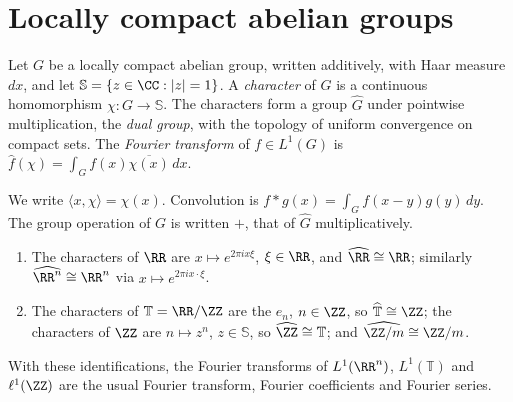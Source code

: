 \section{Locally compact abelian groups}\label{harmonic-analysis:section-lca}

\begin{definition}\label{harmonic-analysis:definition-dual-group}
Let $G$ be a locally compact abelian group, written additively, with Haar measure $dx$, and let $\mathbb{S} = \{z \in \CC : |z| = 1\}$. A \emph{character} of $G$ is a continuous homomorphism $\chi \colon G \to \mathbb{S}$.
The characters form a group $\widehat G$ under pointwise multiplication, the \emph{dual group}, with the topology of uniform convergence on compact sets. The \emph{Fourier transform} of $f \in L^1(G)$ is
$\hat f(\chi) = \int_Gf(x)\overline{\chi(x)}\,dx$.
\end{definition}

\begin{notation}\label{harmonic-analysis:notation-dual-group}
We write $\langle x, \chi\rangle = \chi(x)$. Convolution is $f * g(x) = \int_Gf(x - y)g(y)\,dy$. The group operation of $G$ is written $+$, that of $\widehat G$ multiplicatively.
\end{notation}

\begin{proposition}\label{harmonic-analysis:proposition-characters-r}
\begin{enumerate}
\item The characters of $\RR$ are $x \mapsto e^{2\pi ix\xi}$, $\xi \in \RR$, and $\widehat{\RR} \cong \RR$; similarly $\widehat{\RR^n} \cong \RR^n$ via $x \mapsto e^{2\pi ix\cdot\xi}$.
\item The characters of $\mathbb{T} = \RR/\ZZ$ are the $e_n$, $n \in \ZZ$, so $\widehat{\mathbb{T}} \cong \ZZ$; the characters of $\ZZ$ are $n \mapsto z^n$, $z \in \mathbb{S}$, so $\widehat{\ZZ} \cong \mathbb{T}$; and $\widehat{\ZZ/m} \cong \ZZ/m$.
\end{enumerate}
With these identifications, the Fourier transforms of $L^1(\RR^n)$, $L^1(\mathbb{T})$ and $\ell^1(\ZZ)$ are the usual Fourier transform, Fourier coefficients and Fourier series.
\end{proposition}

